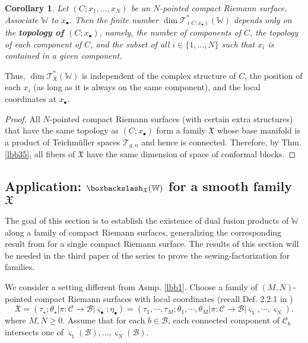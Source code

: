 \documentclass[11pt,b5paper,notitlepage]{article}
\theoremstyle{definition}
\theoremstyle{plain}
\newtheorem{co}[df]{Corollary}
\newcommand{\scr}{\mathscr}
\newcommand{\sgm}{\varsigma}
\newcommand{\blt}{\bullet}
\newcommand{\Wbb}{\mathbb W}
\newcommand{\<}{\left\langle}
\renewcommand{\>}{\right\rangle}
\newcommand{\MC}{\mathcal{C}}
\newcommand{\MB}{\mathcal{B}}
\newcommand{\fx}{\mathfrak{X}}
\newcommand{\bbs}{\boxbackslash}
\numberwithin{equation}{subsection}
\begin{document}
\begin{co}
Let $(C;x_1,\dots,x_N)$ be an $N$-pointed compact Riemann surface. Associate $\Wbb$ to $x_\blt$. Then the finite number $\dim\scr T_{(C;x_\blt)}^*(\Wbb)$ depends only on the \textbf{topology of $(C;x_\blt)$}, namely,  the number of components of $C$, the topology of each component of $C$, and the subset of all $i\in\{1,\dots,N\}$ such that $x_i$ is contained in a given component.
\end{co}

Thus, $\dim\scr T_\fx^*(\Wbb)$ is independent of the complex structure of $C$, the position of each $x_i$ (as long as it is always on the same component), and the local coordinates at $x_\blt$.

\begin{proof}
All $N$-pointed compact Riemann surfaces (with certain extra structures) that have the same topology as $(C;x_\blt)$ form a family $\fx$ whose base manifold is a product of Teichm\"uller spaces $\mathcal T_{g,n}$ and hence is connected. Therefore, by Thm. \ref{lbb35}, all fibers of $\fx$ have the same dimension of space of conformal blocks.
\end{proof}









\subsection{Application: $\bbs_\fx(\Wbb)$ for a smooth family $\fx$}


The goal of this section is to establish the existence of dual fusion products of $\Wbb$ along a family of compact Riemann surfaces, generalizing the corresponding result from \cite{GZ1} for a single compact Riemann surface. The results of this section will be needed in the third paper of the series to prove the sewing-factorization for families.


We consider a setting different from Asmp. \ref{lbb1}. Choose a family of $(M,N)$-pointed compact Riemann surfaces with local coordinates (recall Def. 2.2.1 in \cite{GZ1})
$$
\fx=(\tau_\star;\theta_\star\big| \pi:\MC\rightarrow \MB\big| \varsigma_\blt;\eta_\blt)=(\tau_1,\cdots,\tau_M;\theta_1,\cdots,\theta_M\big| \pi:\MC\rightarrow \MB\big| \varsigma_1,\cdots,\varsigma_N).
$$
where $M,N\geq0$. Assume that for each $b\in\MB$, each connected component of $\MC_b$ intersects one of $\sgm_1(\MB),\dots,\sgm_N(\MB)$. 
\end{document}
